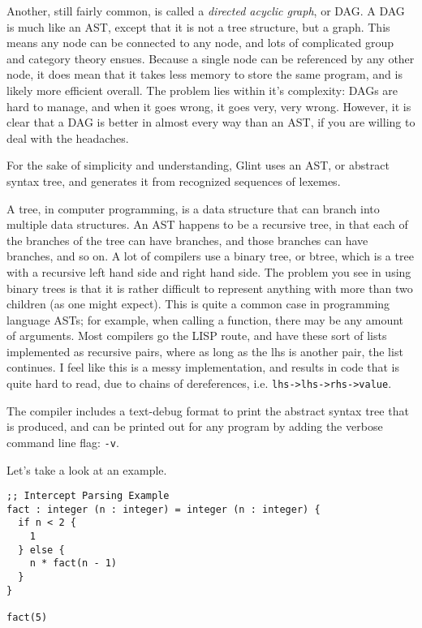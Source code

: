 \documentclass[
12pt,
letterpaper,
oneside,
]{memoir}
\newcommand{\lang}{Glint
}
\begin{document}
Another, still fairly common, is called a \emph{directed acyclic graph}, or DAG. A DAG is much like an AST, except that it is not a tree structure, but a graph. This means any node can be connected to any node, and lots of complicated group and category theory ensues. Because a single node can be referenced by any other node, it does mean that it takes less memory to store the same program, and is likely more efficient overall. The problem lies within it's complexity: DAGs are hard to manage, and when it goes wrong, it goes very, very wrong. However, it is clear that a DAG is better in almost every way than an AST, if you are willing to deal with the headaches.

For the sake of simplicity and understanding, \lang uses an AST, or abstract syntax tree, and generates it from recognized sequences of lexemes.

A tree, in computer programming, is a data structure that can branch into multiple data structures. An AST happens to be a recursive tree, in that each of the branches of the tree can have branches, and those branches can have branches, and so on. A lot of compilers use a binary tree, or btree, which is a tree with a recursive left hand side and right hand side. The problem you see in using binary trees is that it is rather difficult to represent anything with more than two children (as one might expect). This is quite a common case in programming language ASTs; for example, when calling a function, there may be any amount of arguments. Most compilers go the LISP route, and have these sort of lists implemented as recursive pairs, where as long as the lhs is another pair, the list continues. I feel like this is a messy implementation, and results in code that is quite hard to read, due to chains of dereferences, i.e. \verb|lhs->lhs->rhs->value|.

The compiler includes a text-debug format to print the abstract syntax tree that is produced, and can be printed out for any program by adding the verbose command line flag: \verb|-v|.

\filbreak

Let's take a look at an example.
\begin{verbatim}
;; Intercept Parsing Example
fact : integer (n : integer) = integer (n : integer) {
  if n < 2 {
    1
  } else {
    n * fact(n - 1)
  }
}

fact(5)
\end{verbatim}
\end{document}
